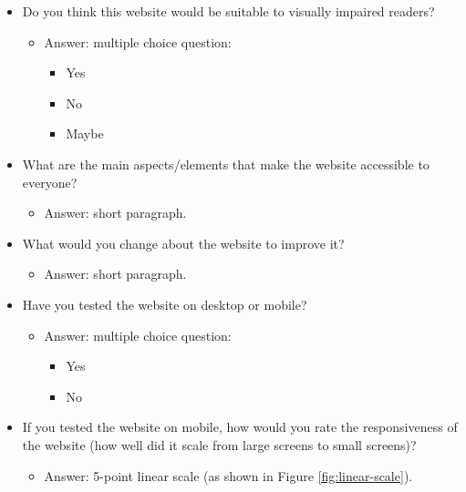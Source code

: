 \documentclass[letterpaper,12pt]{article}
\begin{document}
\begin{appendices}
\begin{itemize}
    \item Do you think this website would be suitable to visually impaired readers?
    \begin{itemize}
        \item Answer: multiple choice question:
        \begin{itemize}
            \item Yes
            \item No
            \item Maybe
        \end{itemize}
    \end{itemize}
\end{itemize}

\begin{itemize}
    \item What are the main aspects/elements that make the website accessible to everyone?
    \begin{itemize}
        \item Answer: short paragraph.
    \end{itemize}
\end{itemize}

\begin{itemize}
    \item What would you change about the website to improve it?
    \begin{itemize}
        \item Answer: short paragraph.
    \end{itemize}
\end{itemize}

\begin{itemize}
    \item Have you tested the website on desktop or mobile?
    \begin{itemize}
        \item Answer: multiple choice question:
        \begin{itemize}
            \item Yes
            \item No
        \end{itemize}
    \end{itemize}
\end{itemize}

\begin{itemize}
    \item If you tested the website on mobile, how would you rate the responsiveness of the website (how well did it scale from large screens to small screens)?
    \begin{itemize}
        \item Answer: 5-point linear scale (as shown in Figure \ref{fig:linear-scale}).
    \end{itemize}
\end{itemize}


\end{appendices}
\end{document}
